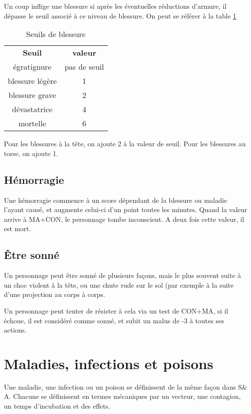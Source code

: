 \documentclass[10pt,a4paper,twocolumn]{book}
\begin{document}
Un coup inflige une blessure si après les éventuelles réductions d'armure, il dépasse le seuil associé à ce niveau de blessure. On peut se référer à la table \ref{tableSeuilsBlessures}

\begin{table}
\caption{Seuils de blessure}
\label{tableSeuilsBlessures}
\begin{tabular}{cc}
\textbf{Seuil} & \textbf{valeur} \\
   égratignure & pas de seuil \\
   blessure légère & 1 \\
   blessure grave & 2 \\
   dévastatrice & 4 \\
   mortelle & 6 \\
\end{tabular}
\end{table}

Pour les blessures à la tête, on ajoute 2 à la valeur de seuil. Pour les blessures au torse, on ajoute 1.
\subsection*{Hémorragie}
Une hémorragie commence à un score dépendant de la blessure ou maladie l'ayant causé, et augmente celui-ci d'un point toutes les minutes. Quand la valeur arrive à MA+CON, le personnage tombe inconscient. A deux fois cette valeur, il est mort.
\subsection*{\^Etre sonné}
Un personnage peut être sonné de plusieurs façons, mais le plus souvent suite à un choc violent à la tête, ou une chute rude sur le sol (par exemple à la suite d'une projection au corps à corps.

Un personnage peut tenter de résister à cela via un test de CON+MA, si il échoue, il est considéré comme sonné, et subit un malus de -3 à toutes ses actions.
\section{Maladies, infections et poisons}
Une maladie, une infection ou un poison se définissent de la même façon dans S\& A. Chacune se définissent en termes mécaniques par un vecteur, une contagion, un temps d'incubation et des effets.
\end{document}
